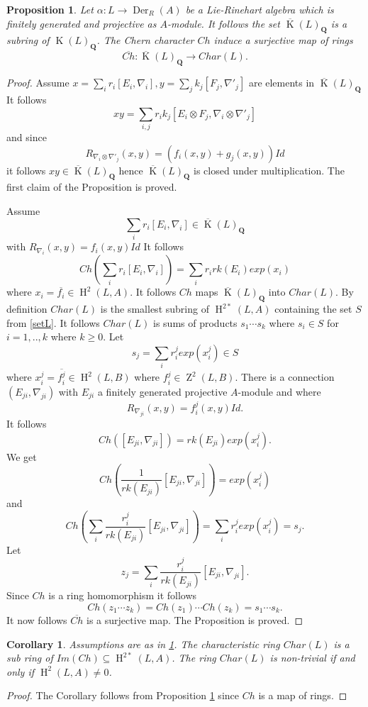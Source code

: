 \documentclass{amsart}
\theoremstyle{plain}
\newtheorem{corollary}[theorem]{Corollary}
\newtheorem{proposition}[theorem]{Proposition}
\theoremstyle{definition}
\theoremstyle{remark}
\numberwithin{equation}{theorem}
\begin{document}
\begin{proposition}\label{subchern} Let  $\alpha:L\rightarrow {\operatorname{Der} }_R(A)$ be a Lie-Rinehart algebra
which is finitely generated and projective as ${A}$-module.
It follows the set $\overline{\operatorname{K}}(L)_{\mathbf{Q} }$ is a subring of ${\operatorname{K}}(L)_{\mathbf{Q} }$.
The Chern character $Ch$ induce a surjective map of rings
\[ \overline{Ch}:\overline{\operatorname{K}}(L)_{\mathbf{Q} }\rightarrow Char(L).\]
\end{proposition}
\begin{proof} Assume $x=\sum_i r_i[E_i,\nabla_i], y=\sum_j k_j[F_j,\nabla'_j]$ are elements in $\overline{\operatorname{K}}(L)_{\mathbf{Q} }$
It follows
\[ xy=\sum_{i,j}r_ik_j[E_i\otimes F_j, \nabla_i \otimes \nabla'_j] \]
and since
\[ R_{\nabla_i \otimes \nabla'_j}(x,y)=(f_i(x,y)+g_j(x,y))Id \]
it follows $xy\in \overline{\operatorname{K}}(L)_{\mathbf{Q} }$ hence $\overline{\operatorname{K}}(L)_{\mathbf{Q} }$ is closed under multiplication. The first claim
of the Proposition is proved.

Assume
\[ \sum_i r_i[E_i,\nabla_i]\in \overline{\operatorname{K}}(L)_{\mathbf{Q} }\]
with $R_{\nabla_i}(x,y)=f_i(x,y)Id$ It follows
\[ Ch(\sum_i r_i[E_i,\nabla_i])=\sum_i r_irk(E_i)exp(x_i) \]
where $x_i=\overline{f_i}\in {\operatorname{H} }^2(L,{A})$. It follows $Ch$ maps $\overline{\operatorname{K}}(L)_{\mathbf{Q} }$ into $Char(L)$. By definition
$Char(L)$ is the smallest subring of ${\operatorname{H} }^{2*}(L,{A})$ containing the set $S$ from \ref{setL}.
It follows $Char(L)$ is sums of products $s_1\cdots s_k$ where $s_i \in S$ for $i=1,..,k$ where $k\geq 0$.
Let
\[ s_j=\sum_i r^j_i exp(x^j_i)\in S\]
where $x^j_i=\overline{f^j_i}\in {\operatorname{H} }^2(L,B)$ where $f^j_i\in {\operatorname{Z}}^2(L,B)$. There is a connection $(E_{ji},\nabla_{ji})$
with $E_{ji}$ a finitely generated projective ${A}$-module and where
\[R_{\nabla_{ji}}(x,y)=f^j_i(x,y)Id .\]
It follows
\[ Ch([E_{ji},\nabla_{ji}])=rk(E_{ji})exp(x^j_i).\]
We get
\[ Ch(\frac{1}{rk(E_{ji})}[E_{ji},\nabla_{ji}])=exp(x^j_i) \]
and
\[ Ch(\sum_i \frac{r^j_i}{rk(E_{ji})}[E_{ji},\nabla_{ji}])=\sum_i r^j_i exp(x^j_i)=s_j.\]
Let
\[ z_j=\sum_i \frac{r^j_i}{rk(E_{ji})}[E_{ji},\nabla_{ji}] .\]
Since $Ch$ is a ring homomorphism it follows
\[ Ch(z_1\cdots z_k)=Ch(z_1)\cdots Ch(z_k)=s_1\cdots s_k  .\]
It now follows  $\overline{Ch}$ is a surjective map. The Proposition is proved.
\end{proof}

\begin{corollary} Assumptions are as in \ref{subchern}. The characteristic ring 
$Char(L)$ is a sub ring of $Im(Ch)\subseteq {\operatorname{H} }^{2*}(L,{A})$. The ring $Char(L)$ is non-trivial if and only if
${\operatorname{H} }^2(L,{A})\neq 0$.
\end{corollary}
\begin{proof} The Corollary follows from Proposition \ref{subchern} since $Ch$ is a map of rings.
\end{proof}
\end{document}
